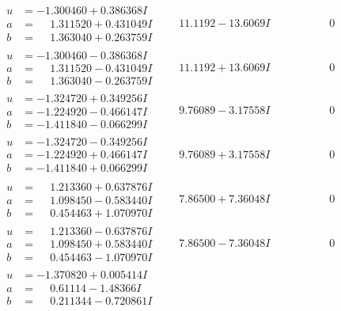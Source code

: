 \documentclass[1p]{elsarticle_modified}
\theoremstyle{definition}
\begin{document}
$$\begin{array}{c|c|c}
\begin{aligned}
u &= -1.300460 + 0.386368 I \\
a &= \phantom{-}1.311520 + 0.431049 I \\
b &= \phantom{-}1.363040 + 0.263759 I\end{aligned}
 & \phantom{-}11.1192 - 13.6069 I & \phantom{-0.000000 } 0 \\ \hline\begin{aligned}
u &= -1.300460 - 0.386368 I \\
a &= \phantom{-}1.311520 - 0.431049 I \\
b &= \phantom{-}1.363040 - 0.263759 I\end{aligned}
 & \phantom{-}11.1192 + 13.6069 I & \phantom{-0.000000 } 0 \\ \hline\begin{aligned}
u &= -1.324720 + 0.349256 I \\
a &= -1.224920 - 0.466147 I \\
b &= -1.411840 - 0.066299 I\end{aligned}
 & \phantom{-}9.76089 - 3.17558 I & \phantom{-0.000000 } 0 \\ \hline\begin{aligned}
u &= -1.324720 - 0.349256 I \\
a &= -1.224920 + 0.466147 I \\
b &= -1.411840 + 0.066299 I\end{aligned}
 & \phantom{-}9.76089 + 3.17558 I & \phantom{-0.000000 } 0 \\ \hline\begin{aligned}
u &= \phantom{-}1.213360 + 0.637876 I \\
a &= \phantom{-}1.098450 - 0.583440 I \\
b &= \phantom{-}0.454463 + 1.070970 I\end{aligned}
 & \phantom{-}7.86500 + 7.36048 I & \phantom{-0.000000 } 0 \\ \hline\begin{aligned}
u &= \phantom{-}1.213360 - 0.637876 I \\
a &= \phantom{-}1.098450 + 0.583440 I \\
b &= \phantom{-}0.454463 - 1.070970 I\end{aligned}
 & \phantom{-}7.86500 - 7.36048 I & \phantom{-0.000000 } 0 \\ \hline\begin{aligned}
u &= -1.370820 + 0.005414 I \\
a &= \phantom{-}0.61114 - 1.48366 I \\
b &= \phantom{-}0.211344 - 0.720861 I\end{aligned}

\end{array}$$
\end{document}
